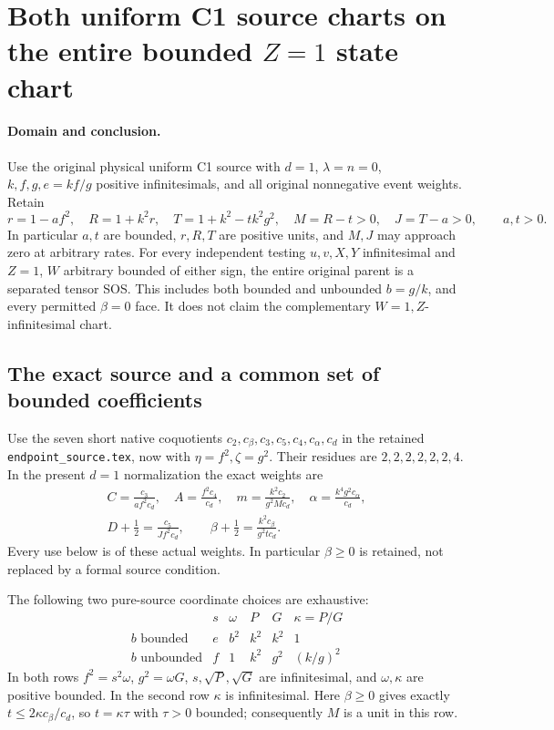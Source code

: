 \section{Both uniform C1 source charts on the entire bounded \(Z=1\) state chart}
\label{sec:uniform-c1-z-new}

\paragraph{Domain and conclusion.}
Use the original physical uniform C1 source with $d=1$,
$\lambda=n=0$, $k,f,g,e=kf/g$ positive infinitesimals, and
all original nonnegative event weights. Retain
\[
 r=1-af^2,\quad R=1+k^2r,\quad
 T=1+k^2-tk^2g^2,\quad M=R-t>0,\quad J=T-a>0,
 \qquad a,t>0.                                                   \tag{EZ1}
\]
In particular $a,t$ are bounded, $r,R,T$ are positive units,
and $M,J$ may approach zero at arbitrary rates.
For every independent testing $u,v,X,Y$ infinitesimal and
$Z=1$, $W$ arbitrary bounded of either sign, the entire original
parent is a separated tensor SOS. This includes both bounded
and unbounded $b=g/k$, and every permitted $\beta=0$ face.
It does not claim the complementary $W=1,Z$-infinitesimal chart.

\subsection{The exact source and a common set of bounded coefficients}

Use the seven short native coquotients
$c_2,c_\beta,c_3,c_5,c_4,c_\alpha,c_d$ in the retained
\texttt{endpoint\_source.tex}, now with $\eta=f^2,\zeta=g^2$.
Their residues are $2,2,2,2,2,2,4$.
In the present $d=1$ normalization the exact weights are
\[
\begin{gathered}
 C=\frac{c_3}{af^2c_d},\quad A=\frac{f^2c_4}{c_d},\quad
 m=\frac{k^2c_2}{g^2Mc_d},\quad
 \alpha=\frac{k^4g^2c_\alpha}{c_d},\\
 D+\tfrac12=\frac{c_5}{Jf^2c_d},\qquad
 \beta+\tfrac12=\frac{k^2c_\beta}{g^2tc_d}.
\end{gathered}                                                   \tag{EZ2}
\]
Every use below is of these actual weights. In particular
$\beta\geq0$ is retained, not replaced by a formal source condition.

The following two pure-source coordinate choices are exhaustive:
\[
\begin{array}{c|ccccc}
 &s&\omega&P&G&\kappa=P/G\\ \hline
 b\text{ bounded}&e&b^2&k^2&k^2&1\\
 b\text{ unbounded}&f&1&k^2&g^2&(k/g)^2
\end{array}                                                     \tag{EZ3}
\]
In both rows $f^2=s^2\omega$, $g^2=\omega G$,
$s,\sqrt P,\sqrt G$ are infinitesimal, and $\omega,\kappa$
are positive bounded. In the second row $\kappa$ is infinitesimal.
Here $\beta\geq0$ gives exactly
$t\leq2\kappa c_\beta/c_d$, so $t=\kappa\tau$ with
$\tau>0$ bounded; consequently $M$ is a unit in this row.

